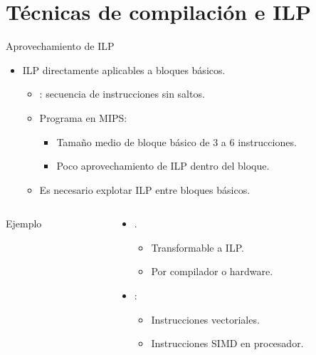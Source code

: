 \section{Técnicas de compilación e ILP}

\begin{frame}[t]{Aprovechamiento de ILP}
\begin{itemize}
  \item ILP directamente aplicables a bloques básicos.
    \begin{itemize}
      \item {}: secuencia de instrucciones sin saltos.
      \item Programa  en MIPS:
        \begin{itemize}
          \item Tamaño medio de bloque básico de 3 a 6 instrucciones.
          \item Poco aprovechamiento de ILP dentro del bloque.
        \end{itemize}
      \item Es necesario explotar ILP entre bloques básicos.
    \end{itemize}
\end{itemize}

\begin{columns}

  \begin{column}{.4\textwidth}
    \begin{block}{Ejemplo}
      
    \end{block}
  \end{column}

  \begin{column}{.6\textwidth}
    \begin{itemize}
      \item {}.
        \begin{itemize}
          \item Transformable a ILP.
          \item Por compilador o hardware.
        \end{itemize}
      \item {}:
        \begin{itemize}
          \item Instrucciones vectoriales.
          \item Instrucciones SIMD en procesador.
        \end{itemize}
    \end{itemize}
  \end{column}
\end{columns}
\end{frame}

